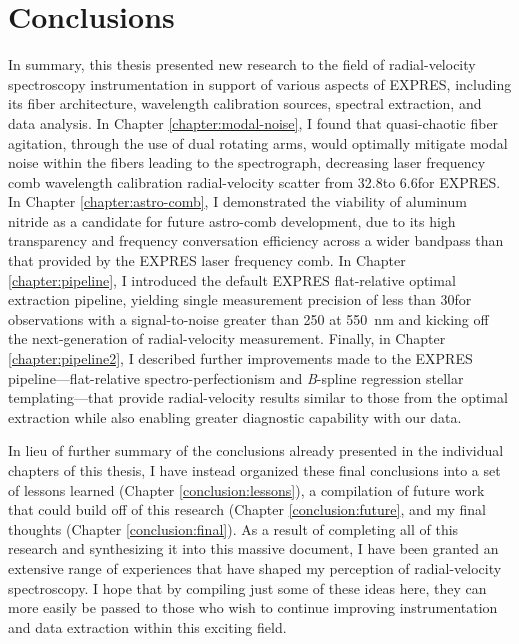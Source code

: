 \chapter{Conclusions}\label{chapter:conclusion}

In summary, this thesis presented new research to the field of radial-velocity spectroscopy instrumentation in support of various aspects of EXPRES, including its fiber architecture, wavelength calibration sources, spectral extraction, and data analysis. In Chapter \ref{chapter:modal-noise}, I found that quasi-chaotic fiber agitation, through the use of dual rotating arms, would optimally mitigate modal noise within the fibers leading to the spectrograph, decreasing laser frequency comb wavelength calibration radial-velocity scatter from 32.8\cms to 6.6\cms for EXPRES. In Chapter \ref{chapter:astro-comb}, I demonstrated the viability of aluminum nitride as a candidate for future astro-comb development, due to its high transparency and frequency conversation efficiency across a wider bandpass than that provided by the EXPRES laser frequency comb. In Chapter \ref{chapter:pipeline}, I introduced the default EXPRES flat-relative optimal extraction pipeline, yielding single measurement precision of less than 30\cms for observations with a signal-to-noise greater than 250 at 550~\si{\nano\meter} and kicking off the next-generation of radial-velocity measurement. Finally, in Chapter \ref{chapter:pipeline2}, I described further improvements made to the EXPRES pipeline---flat-relative spectro-perfectionism and \textit{B}-spline regression stellar templating---that provide radial-velocity results similar to those from the optimal extraction while also enabling greater diagnostic capability with our data.

In lieu of further summary of the conclusions already presented in the individual chapters of this thesis, I have instead organized these final conclusions into a set of lessons learned (Chapter \ref{conclusion:lessons}), a compilation of future work that could build off of this research (Chapter \ref{conclusion:future}, and my final thoughts (Chapter \ref{conclusion:final}). As a result of completing all of this research and synthesizing it into this massive document, I have been granted an extensive range of experiences that have shaped my perception of radial-velocity spectroscopy. I hope that by compiling just some of these ideas here, they can more easily be passed to those who wish to continue improving instrumentation and data extraction within this exciting field.

